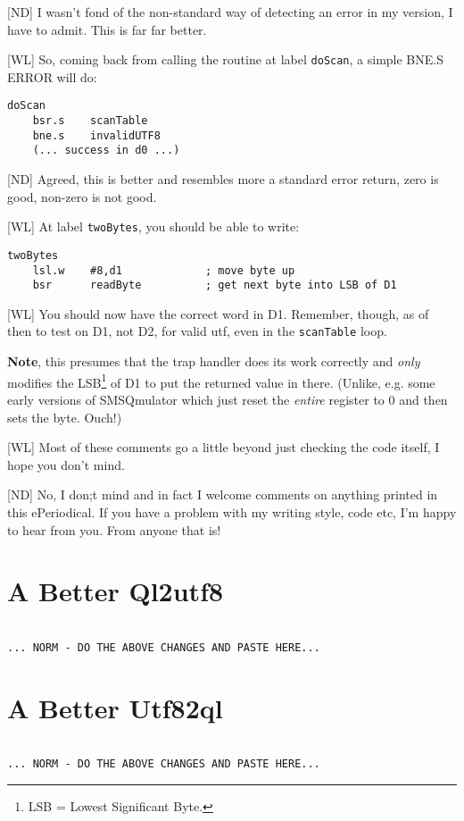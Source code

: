[ND] I wasn't fond of the non-standard way of detecting an error in my version, I have to admit. This is far far better.

[WL] So, coming back from calling the routine at label \texttt{doScan}, a simple BNE.S ERROR will do:
	
\begin{lstlisting}[numbers=none]	
  doScan   
    bsr.s    scanTable
    bne.s    invalidUTF8
    (... success in d0 ...)
\end{lstlisting}

[ND] Agreed, this is better and resembles more a standard error return, zero is good, non-zero is not good.

[WL] At label \texttt{twoBytes}, you should be able to write:

\begin{lstlisting}[numbers=none]
  twoBytes
    lsl.w    #8,d1             ; move byte up
    bsr      readByte          ; get next byte into LSB of D1
\end{lstlisting}
	
[WL] You should now have the correct word in D1. Remember, though, as of then to test on D1, not D2, for valid utf, even in the \texttt{scanTable} loop.

\textbf{Note}, this presumes that the trap handler does its work correctly and \emph{only} modifies the LSB\footnote{LSB = Lowest Significant Byte.} of D1 to put the returned value in there. (Unlike, e.g. some early versions of SMSQmulator which just reset the \emph{entire} register to 0 and then sets the byte. Ouch!)
	
[WL] Most of these comments go a little beyond just checking the code itself, I hope you don't mind.

[ND] No, I don;t mind and in fact I welcome comments on anything printed in this ePeriodical. If you have a problem with my writing style, code etc, I'm happy to hear from you. From anyone that is!

\section{A Better Ql2utf8}

\begin{lstlisting}[firstnumber=1, caption={Wolfgang's improved ql2utf8 Utility}]

... NORM - DO THE ABOVE CHANGES AND PASTE HERE...

\end{lstlisting}


\section{A Better Utf82ql}

\begin{lstlisting}[firstnumber=1, caption={Wolfgang's improved utf82ql Utility}]

... NORM - DO THE ABOVE CHANGES AND PASTE HERE...

\end{lstlisting}
